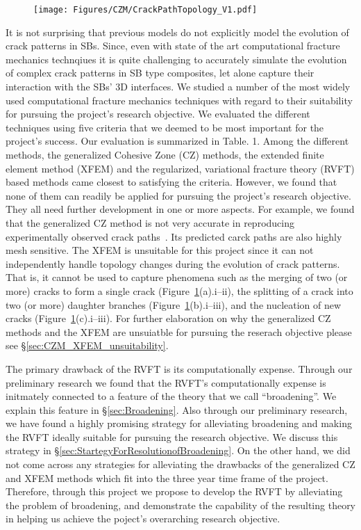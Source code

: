 \documentclass[10pt,letterpaper]{article}
\begin{document}
    \begin{figure}
          \centering
          \texttt{[image: Figures/CZM/CrackPathTopology\_V1.pdf]}
          \caption{\footnotesize}
          \label{f:topchanges}
    \end{figure}


It is not surprising that previous models do not explicitly model the evolution of crack patterns in SBs. Since,  even with state of the art computational fracture mechanics technqiues it is quite challenging  to accurately simulate the evolution of complex crack patterns in SB type composites, let alone capture their interaction with the SBs' 3D interfaces. We studied a number of  the most widely used computational fracture mechanics techniques with regard to their suitability for  pursuing the project's research objective. We evaluated the different techniques using  five criteria that we deemed  to be  most important for the project's success.  Our evaluation is summarized in Table. 1. Among the different  methods,  the  generalized Cohesive Zone (CZ) methods, the extended finite element method (XFEM) and the regularized, variational fracture theory  (RVFT) based methods came closest to satisfying  the criteria.  However,  we found that none of them can readily be applied for pursuing the project's research objective. They all need  further development in one or more aspects. For example,  we found that the  generalized  CZ method is not very accurate in reproducing experimentally observed crack paths~\cite{tijssens2000numerical,de2003numerical,de2004computational}. Its predicted carck paths are also highly mesh sensitive. The XFEM is unsuitable for this project since  it can not independently handle topology changes during the evolution of crack patterns.  That is, it cannot  be used to capture phenomena such as  the merging of two (or more)  cracks to  form a single crack (Figure~\ref{f:topchanges}(a).i--ii), the splitting of a crack into two (or more)  daughter branches (Figure~\ref{f:topchanges}(b).i--iii), and  the nucleation of new cracks (Figure~\ref{f:topchanges}(c).i--iii). For further elaboration on why the  generalized CZ methods and the XFEM are unsuiatble for pursuing the reserach objective please see  \S\ref{sec:CZM_XFEM_unsuitability}.%

The primary drawback of the RVFT  is its  computationally expense. Through  our preliminary research we found that the  RVFT's  computationally expense is initmately connected to a feature of the theory that we  call  ``broadening''.   We explain  this  feature in \S\ref{sec:Broadening}.%
Also through our  preliminary research, we have found a   highly promising strategy for alleviating broadening and making the RVFT ideally suitable for pursuing the research objective. We discuss this strategy in \S\ref{sec:StartegyForResolutionofBroadening}.%
On the other hand, we  did not come across any strategies for alleviating the drawbacks of the generalized CZ and XFEM methods which fit into the three year time frame of the project. Therefore, through this project we propose to develop the RVFT by alleviating the problem of broadening,  and demonstrate  the  capability of the resulting theory  in helping us  achieve  the poject's overarching  research objective.%
\end{document}
